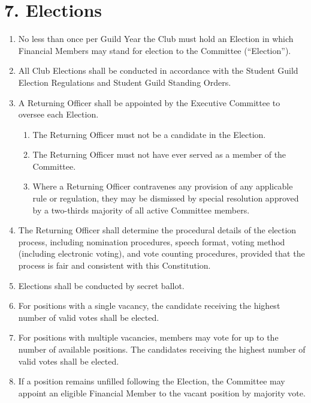 \documentclass[12pt]{article}
\begin{document}
\section{7. Elections}
\begin{enumerate}[label=7.\arabic*]
\item No less than once per Guild Year the Club must hold an Election in which Financial Members may stand for election to the Committee (``Election'').

\item All Club Elections shall be conducted in accordance with the Student Guild Election Regulations and Student Guild Standing Orders.

\item A Returning Officer shall be appointed by the Executive Committee to oversee each Election.
  \begin{enumerate}[label=7.3.\arabic*]
    \item The Returning Officer must not be a candidate in the Election.
    \item The Returning Officer must not have ever served as a member of the Committee.
    \item Where a Returning Officer contravenes any provision of any applicable rule or regulation, they may be dismissed by special resolution approved by a two-thirds majority of all active Committee members.
  \end{enumerate}

\item The Returning Officer shall determine the procedural details of the election process, including nomination procedures, speech format, voting method (including electronic voting), and vote counting procedures, provided that the process is fair and consistent with this Constitution.

\item Elections shall be conducted by secret ballot.

\item For positions with a single vacancy, the candidate receiving the highest number of valid votes shall be elected.

\item For positions with multiple vacancies, members may vote for up to the number of available positions. The candidates receiving the highest number of valid votes shall be elected.

\item If a position remains unfilled following the Election, the Committee may appoint an eligible Financial Member to the vacant position by majority vote.


\end{enumerate}
\end{document}
